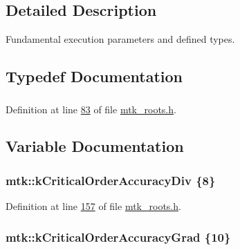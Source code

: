 \subsection{Detailed Description}
Fundamental execution parameters and defined types. 

\subsection{Typedef Documentation}
\hypertarget{group__c01-roots_gac080bbbf5cbb5502c9f00405f894857d}{
\subsubsection[{Real}]{}}\label{group__c01-roots_gac080bbbf5cbb5502c9f00405f894857d}


Definition at line \hyperlink{mtk__roots_8h_source_l00083}{83} of file \hyperlink{mtk__roots_8h_source}{mtk\+\_\+roots.\+h}.



\subsection{Variable Documentation}
\hypertarget{group__c01-roots_ga0898eef2108473e44a5223932d571c31}{
\subsubsection[{k\+Critical\+Order\+Accuracy\+Div}]{\setlength{\rightskip}{0pt plus 5cm}mtk\+::k\+Critical\+Order\+Accuracy\+Div \{8\}}}\label{group__c01-roots_ga0898eef2108473e44a5223932d571c31}


Definition at line \hyperlink{mtk__roots_8h_source_l00157}{157} of file \hyperlink{mtk__roots_8h_source}{mtk\+\_\+roots.\+h}.

\hypertarget{group__c01-roots_ga295dd2f403c775ecd942c22b5a777496}{
\subsubsection[{k\+Critical\+Order\+Accuracy\+Grad}]{\setlength{\rightskip}{0pt plus 5cm}mtk\+::k\+Critical\+Order\+Accuracy\+Grad \{10\}}}\label{group__c01-roots_ga295dd2f403c775ecd942c22b5a777496}


